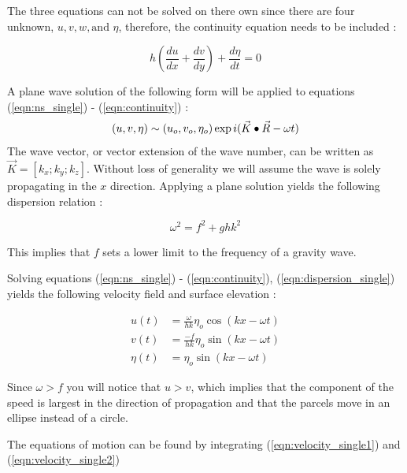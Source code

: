 The three equations can not be solved on there own since there are four unknown, $u,v,w, \text{and } \eta$, therefore, the continuity equation needs to be included : 

\begin{equation} 
	h(\frac{du}{dx} + \frac{dv}{dy})+ \frac{d \eta}{dt}=0  \label{eqn:continuity}
\end{equation}  

A plane wave solution of the following form will be applied to equations \newline
(\ref{eqn:ns_single}) - (\ref{eqn:continuity}) :
 \begin{equation} 
 	(u,v,\eta) \sim (u_o,v_o,\eta_o)\exp{i(\vec{K} \bullet \vec{R}-\omega t)} \label{eqn:plane_wave}
\end{equation}
The wave vector, or vector extension of the wave number, can be written as $\vec{K} = [k_x; k_y; k_z]$. Without loss of generality 
we will assume the wave is solely propagating in the $x$ direction. Applying a plane solution yields the following dispersion relation : %



\begin{equation} 
	\omega^2 = f^2 + ghk^2 \label{eqn:dispersion_single}
\end{equation}

This implies that $f$ sets a lower limit to the frequency of a gravity wave. 

Solving equations  (\ref{eqn:ns_single}) - (\ref{eqn:continuity}), (\ref{eqn:dispersion_single}) yields the following velocity field and surface elevation : 



\begin{align}
	u(t) &= \frac{\omega}{hk} \eta_o \cos(kx-\omega t) \label{eqn:velocity_single1} \\
	v(t) &= \frac{-f}{hk} \eta_o \sin(kx-\omega t) \label{eqn:velocity_single2} \\
	\eta(t) &= \eta_o \sin(kx-\omega t)
\end{align}



Since $\omega > f$ you will notice that  $u>v$, which implies that the component of the speed is largest in the direction of propagation and that the 
parcels move in an ellipse instead of a circle. 

The equations of motion can be found by integrating (\ref{eqn:velocity_single1}) and (\ref{eqn:velocity_single2})


